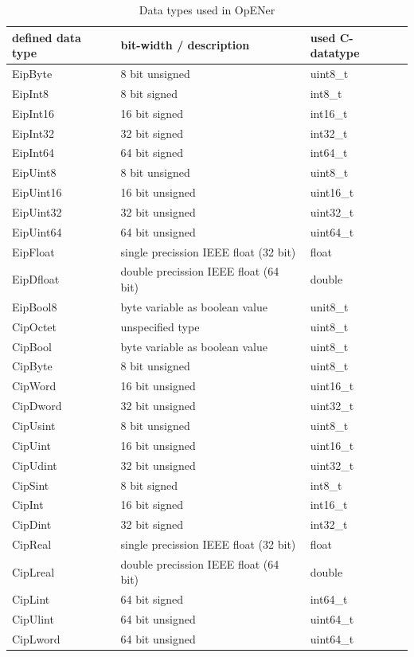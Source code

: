 \documentclass[final,a4paper,10pt, oneside]{article}
\begin{document}
\begin{table}[h]
\caption{Data types used in OpENer} \label{tab:datatypes}
	\centering
		\begin{tabular}{lll}
			defined data type	& bit-width / description & used C-datatype \\
			\hline
			EipByte	&	8 bit unsigned	&   uint8\_t\\
			EipInt8	&	8 bit signed	&	int8\_t	 \\
			EipInt16	&	16 bit signed	&	int16\_t	 \\
			EipInt32	&	32 bit signed	&	int32\_t	 \\
			EipInt64 & 64 bit signed & int64\_t \\
			EipUint8	&	8 bit unsigned	&	uint8\_t	 \\
			EipUint16	&	16 bit unsigned	&	uint16\_t	 \\
			EipUint32	&	32 bit unsigned	&	uint32\_t	 \\
			EipUint64 & 64 bit unsigned & uint64\_t \\
			EipFloat	&	single precission IEEE float (32 bit) &	float	 \\
			EipDfloat	&	double precission IEEE float (64 bit) &	double	\\
			EipBool8	&	byte variable as boolean value	&	unit8\_t	 \\

			CipOctet & unspecified type & uint8\_t \\
			CipBool & byte variable as boolean value & uint8\_t \\
			CipByte & 8 bit unsigned & uint8\_t \\
			CipWord & 16 bit unsigned & uint16\_t \\
			CipDword & 32 bit unsigned & uint32\_t \\
			CipUsint & 8 bit unsigned & uint8\_t \\
			CipUint & 16 bit unsigned & uint16\_t \\
			CipUdint & 32 bit unsigned & uint32\_t \\
			CipSint & 8 bit signed & int8\_t \\
			CipInt & 16 bit signed & int16\_t \\
			CipDint & 32 bit signed & int32\_t \\
			CipReal & single precission IEEE float (32 bit) & float \\
			CipLreal & double precission IEEE float (64 bit) & double \\

			CipLint & 64 bit signed & int64\_t \\
			CipUlint & 64 bit unsigned & uint64\_t \\
			CipLword & 64 bit unsigned & uint64\_t
		\end{tabular}
\end{table}
\end{document}
